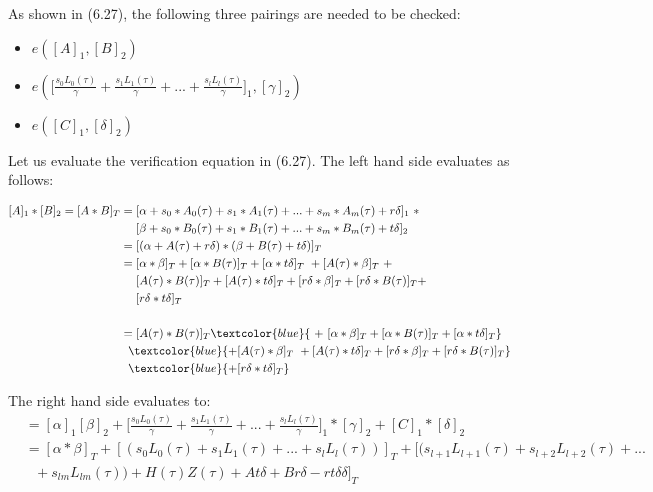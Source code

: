 As shown in (6.27), the following three pairings are needed to be checked:

\begin{itemize}
    \item \(e([A]_1, [B]_2)\)
    \item \begin{math}
        e(\bigl[\frac{s_0L_0(\tau)}{\gamma}+ \frac{s_1L_1(\tau)}{\gamma} + ... + \frac{s_lL_l(\tau)}{\gamma}\bigr]_1 , [\gamma]_2)
    \end{math}
    \item \begin{math}
        e([C]_1, [\delta]_2)
    \end{math}
\end{itemize}

Let us evaluate the verification equation in (6.27). The left hand side evaluates as follows:

\begin{equation*}
\begin{split}
    [A]_1 * [B]_2 = [A*B]_T &= [\alpha + s_0*A_0(\tau) + s_1*A_1(\tau) + ... + s_m*A_m(\tau) + r\delta]_1 \ *\\
    &\ \ \ \ [\beta + s_0*B_0(\tau) + s_1*B_1(\tau) + ... + s_m*B_m(\tau) + t\delta]_2 \\
    &= [(\alpha + A(\tau) + r\delta) * (\beta + B(\tau) + t\delta)]_T\\
    &= [\alpha * \beta]_T + [\alpha * B(\tau)]_T + [\alpha * t\delta]_T \ + [A(\tau) * \beta]_T \ + \\
    &\ \ \ \ [A(\tau) * B(\tau)]_T + [A(\tau) * t\delta]_T + [r\delta * \beta]_T + [r\delta * B(\tau)]_T +\\
    &\ \ \ \ [r\delta * t\delta]_T \\
    \\
    &= [A(\tau) * B(\tau)]_T \textcolor{blue}{\ +\ [\alpha * \beta]_T + [\alpha * B(\tau)]_T + [\alpha * t\delta]_T} \\
    &\ \ \textcolor{blue}{+ [A(\tau) * \beta]_T \ + [A(\tau) * t\delta]_T + [r\delta * \beta]_T + [r\delta * B(\tau)]_T} \\
    &\ \ \textcolor{blue}{+ [r\delta * t\delta]_T}
\end{split}
\end{equation*}

The right hand side evaluates to:
 \begin{equation*}
     \begin{split}
    &=[\alpha]_1[\beta]_2 + \bigl[\frac{s_0L_0(\tau)}{\gamma}+ \frac{s_1L_1(\tau)}{\gamma} + ... + \frac{s_lL_l(\tau)}{\gamma}\bigr]_1 * [\gamma]_2 + [C]_1 * [\delta]_2 \\
    &=[\alpha * \beta]_T + [(s_0L_0(\tau) + s_1L_1(\tau) + ... + s_lL_l(\tau))]_T + [(s_{l+1}L_{l+1}(\tau) + s_{l+2}L_{l+2}(\tau) + ... \\
    &\ \ \ + s_{lm}L_{lm}(\tau)) + H(\tau)Z(\tau) + At\delta + Br\delta - rt\delta\delta]_T
     \end{split}
 \end{equation*}

